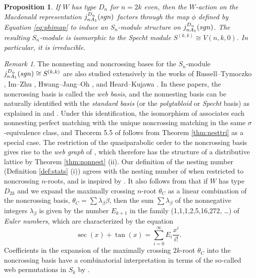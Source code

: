 \documentclass[11pt]{amsart}
\theoremstyle{plain}
\newtheorem{prop}[theorem]{Proposition}
\theoremstyle{definition}
\theoremstyle{remark}
\newtheorem{rmk}[theorem]{Remark}
\numberwithin{equation}{subsection}
\newcommand{\be}{\beta}
\newcommand{\macd}[2]{j^{#1}_{#2}({\rm{sgn}})}
\begin{document}
\begin{prop}
\label{prop:specht}
If $W$ has type $D_{n}$ for $n=2k$ even, then the $W$-action on the Macdonald
representation $\macd{D_n}{nA_1}$ factors through the map $\phi$ defined by
Equation \eqref{eq:phimap} to induce an $S_n$-module structure on
$\macd{D_n}{nA_1}$.  The resulting $S_n$-module is isomorphic to the Specht
module $S^{(k,k)}\cong V(n,k,0)$. In particular, it is irreducible.
\end{prop}


\begin{rmk}\label{rmk:webgraph}
The nonnesting and noncrossing bases for the $S_n$-module $\macd{D_n}{nA_1}\cong
S^{(k,k)}$ are also studied extensively in the works of Russell--Tymoczko
\cite{russell19}, Im--Zhu \cite{im22}, Hwang--Jang--Oh \cite{hwang23}, and
Heard--Kujawa \cite{kujawa24}. In these papers, the noncrossing basis is called
the \emph{web basis}, and the nonnesting basis can be naturally identified with
the \emph{standard basis} (or the \emph{polytabloid} or \emph{Specht} basis) as
explained in \cite[Lemma 3.1]{im22} and \cite[Section 1]{hwang23}. Under this
identification, the isomorphism of \cite[Theorem 2.2]{russell19} associates each
nonnesting perfect matching with the unique noncrossing matching in the same
$\sigma$-equivalence class, and Theorem 5.5 of \cite{russell19} follows from
Theorem \ref{thm:nesttri} as a special case.  The restriction of the
quasiparabolic order to the noncrossing basis gives rise to the {\it web graph}
of \cite[Section 2.3]{russell19}, which therefore has the structure of a
distributive lattice by Theorem \ref{thm:nonnest} (ii).  Our definition of the
nesting number (Definition \ref{def:stats} (i)) agrees with the nesting number
of \cite{russell19} when restricted to noncrossing $n$-roots, and is inspired by
\cite{russell19}.  It also follows from \cite[Corollary 4.2]{hwang23} that if
$W$ has type $D_{2k}$ and we expand the maximally crossing $n$-root $\theta_C$
as a linear combination of the noncrossing basis, $\theta_C = \sum \lambda_\be
\be$, then the sum $\sum \lambda_\be$ of the nonnegative integers $\lambda_\be$
is given by the number $E_{k+1}$ in the family (1,1,1,2,5,16,272, \dots) of
\emph{Euler numbers}, which are characterized by the equation $$ \sec(x) +
\tan(x) = \sum_{i = 0}^\infty E_i \frac{x^i}{i!} .$$ Coefficients in the
expansion of the maximally crossing $2k$-root $\theta_C$ into the noncrossing
basis have a combinatorial interpretation in terms of the so-called web
permutations in  $S_k$ by \cite[Theorem 1.2]{hwang23}.
\end{rmk}
\end{document}
